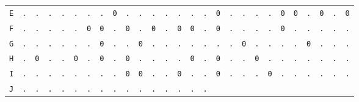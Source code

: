 \begin{figure}[H]
\begin{center}
{\begin{tabular}{c|cccccccccccccccccccccccccc}
        \texttt{E} & \texttt{.} & \texttt{.} & \texttt{.} &
        \texttt{.} & \texttt{.} & \texttt{.} & \texttt{.} &
        \texttt{0} & \texttt{.} & \texttt{.} & \texttt{.} &
        \texttt{.} & \texttt{.} & \texttt{.} & \texttt{.} &
        \texttt{0} & \texttt{.} & \texttt{.} & \texttt{.} &
        \texttt{.} & \texttt{0} & \texttt{0} & \texttt{.} &
        \texttt{0} & \texttt{.} & \texttt{0}                             \\
        \texttt{F} & \texttt{.} & \texttt{.} & \texttt{.} &
        \texttt{.} & \texttt{.} & \texttt{0} & \texttt{0} &
        \texttt{.} & \texttt{0} & \texttt{.} & \texttt{0} &
        \texttt{.} & \texttt{0} & \texttt{0} & \texttt{.} &
        \texttt{0} & \texttt{.} & \texttt{.} & \texttt{.} &
        \texttt{.} & \texttt{0} & \texttt{.} & \texttt{.} &
        \texttt{.} & \texttt{.} & \texttt{.}                             \\
        \texttt{G} & \texttt{.} & \texttt{.} & \texttt{.} &
        \texttt{.} & \texttt{.} & \texttt{.} & \texttt{0} &
        \texttt{.} & \texttt{.} & \texttt{0} & \texttt{.} &
        \texttt{.} & \texttt{.} & \texttt{.} & \texttt{.} &
        \texttt{.} & \texttt{.} & \texttt{0} & \texttt{.} &
        \texttt{.} & \texttt{.} & \texttt{.} & \texttt{0} &
        \texttt{.} & \texttt{.} & \texttt{.}                             \\
        \texttt{H} & \texttt{.} & \texttt{0} & \texttt{.} &
        \texttt{.} & \texttt{0} & \texttt{.} & \texttt{0} &
        \texttt{.} & \texttt{0} & \texttt{.} & \texttt{.} &
        \texttt{.} & \texttt{.} & \texttt{0} & \texttt{.} &
        \texttt{0} & \texttt{.} & \texttt{.} & \texttt{0} &
        \texttt{.} & \texttt{.} & \texttt{.} & \texttt{.} &
        \texttt{.} & \texttt{.} & \texttt{.}                             \\
        \texttt{I} & \texttt{.} & \texttt{.} & \texttt{.} &
        \texttt{.} & \texttt{.} & \texttt{.} & \texttt{.} &
        \texttt{.} & \texttt{0} & \texttt{0} & \texttt{.} &
        \texttt{.} & \texttt{0} & \texttt{.} & \texttt{.} &
        \texttt{0} & \texttt{.} & \texttt{.} & \texttt{.} &
        \texttt{0} & \texttt{.} & \texttt{.} & \texttt{.} &
        \texttt{.} & \texttt{.} & \texttt{.}                             \\
        \texttt{J} & \texttt{.} & \texttt{.} & \texttt{.} &
        \texttt{.} & \texttt{.} & \texttt{.} & \texttt{.} &
        \texttt{.} & \texttt{.} & \texttt{.} & \texttt{.} &
        \texttt{.} & \texttt{.} & \texttt{.} & \texttt{.} &

\end{tabular}}
\end{center}
\end{figure}

